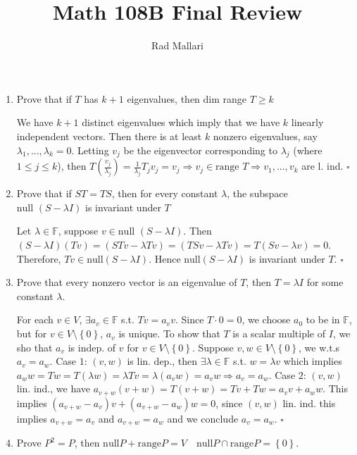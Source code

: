 \documentclass[10pt]{article}
\title{Math 108B Final Review}
\author{Rad Mallari}
\newcommand{\set}[1]{\left\{ #1\right\}}
\newenvironment{proof}{\noindent{\bf Proof.}}{\hfill $\square$\medskip}
\begin{document}
\maketitle
\begin{enumerate}
    \item Prove that if $T$ has $k+1$ eigenvalues, then dim range $T\geq k$

    \begin{proof}
        We have $k+1$ distinct eigenvalues which imply that we have $k$ linearly independent vectors. Then there is at least $k$ nonzero eigenvalues, say $\lambda_{1},...,\lambda_{k}=0$. Letting $v_{j}$ be the eigenvector corresponding to $\lambda_{j}$ (where $1\leq j\leq k$), then $T(\frac{v_{j}}{\lambda_{j}})=\frac{1}{\lambda_{j}}T_{j}v_{j}=v_{j}\Rightarrow v_{j}\in\text{range }T\Rightarrow v_{1},...,v_{k}$ are l. ind.
    \end{proof}
    \item Prove that if $ST=TS$, then for every constant $\lambda$, the subspace $\text{null }(S-\lambda I)$ is invariant under $T$

    \begin{proof}
        Let $\lambda\in \mathbb{F}$, suppose $v\in\text{null }(S-\lambda I)$. Then $(S-\lambda I)(Tv)=(STv-\lambda Tv)=(TSv-\lambda Tv)=T(Sv-\lambda v)=0$. Therefore, $Tv\in\text{null}(S-\lambda I)$. Hence $\text{null}(S-\lambda I)$ is invariant under $T$.
    \end{proof}
    \item Prove that every nonzero vector is an eigenvalue of $T$, then $T=\lambda I$ for some constant $\lambda$.
    
    \begin{proof}
        For each $v\in V$, $\exists a_{v}\in\mathbb{F}$ s.t. $Tv=a_{v}v$. Since $T\cdot0=0$, we choose $a_{0}$ to be in $\mathbb{F}$, but for $v\in V\setminus\set{0}$, $a_{v}$ is unique. To show that $T$ is a scalar multiple of $I$, we sho that $a_{v}$ is indep. of $v$ for $v\in V\setminus\set{0}$. Suppose $v,w\in V\setminus\set{0}$, we w.t.s $a_{v}=a_{w}$. Case $1$: $(v,w)$ is lin. dep., then $\exists\lambda\in\mathbb{F}$ s.t. $w=\lambda v$ which implies $a_{w}w=Tw=T(\lambda w)=\lambda Tv=\lambda (a_{v}w)=a_{v}w\Rightarrow a_{v}=a_{w}$. Case $2$: $(v,w)$ lin. ind., we have $a_{v+w}(v+w)=T(v+w)=Tv+Tw=a_{v}v+a_{w}w$. This implies $(a_{v+w}-a_{v})v+(a_{v+w}-a_{w})w=0$, since $(v,w)$ lin. ind. this implies $a_{v+w}=a_{v}$ and $a_{v+w}=a_{w}$ and we conclude $a_{v}=a_{w}$. 
    \end{proof}
    \item Prove $P^{2}=P$, then $\text{null}P+\text{range}P=V\quad\text{null}P\cap\text{range}P=\set{0}$.
    

\end{enumerate}
\end{document}
